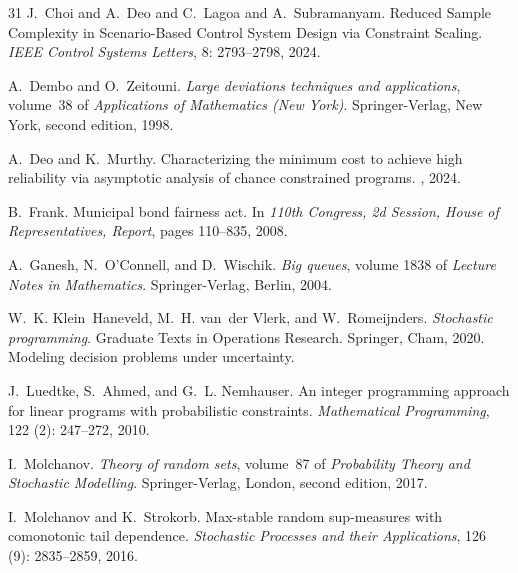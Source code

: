 \documentclass[a4paper, a4wide, 10pt, reqno]{amsart}
\theoremstyle{plain}
\begin{document}
\begin{thebibliography}{31}
J.~Choi and A.~Deo and C.~Lagoa and A.~Subramanyam.
\newblock Reduced Sample Complexity in Scenario-Based Control System Design via Constraint Scaling.
\newblock
\emph{IEEE Control Systems Letters}, 8: 2793--2798, 2024.
 


A.~Dembo and O.~Zeitouni.
\newblock \emph{Large deviations techniques and applications}, volume~38 of \emph{Applications of Mathematics (New York)}.
\newblock Springer-Verlag, New York, second edition, 1998.

A.~Deo and K.~Murthy.
\newblock Characterizing the minimum cost to achieve high reliability via asymptotic analysis of chance constrained programs.
, 2024.

B.~Frank.
\newblock Municipal bond fairness act.
\newblock In \emph{110th Congress, 2d Session, House of Representatives, Report}, pages 110--835, 2008.

A.~Ganesh, N.~O'Connell, and D.~Wischik.
\newblock \emph{Big queues}, volume 1838 of \emph{Lecture Notes in Mathematics}.
\newblock Springer-Verlag, Berlin, 2004.

W.~K. Klein~Haneveld, M.~H. van~der Vlerk, and W.~Romeijnders.
\newblock \emph{Stochastic programming}.
\newblock Graduate Texts in Operations Research. Springer, Cham, 2020.
\newblock Modeling decision problems under uncertainty.

J.~Luedtke, S.~Ahmed, and G.~L. Nemhauser.
\newblock An integer programming approach for linear programs with probabilistic constraints.
\newblock \emph{Mathematical Programming}, 122 (2): 247--272, 2010.

I.~Molchanov.
\newblock \emph{Theory of random sets}, volume~87 of \emph{Probability Theory and Stochastic Modelling}.
\newblock Springer-Verlag, London, second edition, 2017.

I.~Molchanov and K.~Strokorb.
\newblock Max-stable random sup-measures with comonotonic tail dependence.
\newblock \emph{Stochastic Processes and their Applications}, 126 (9): 2835--2859, 2016.


\end{thebibliography}
\end{document}
